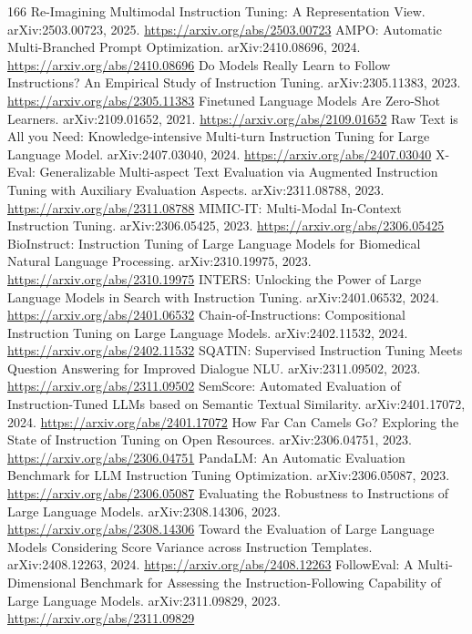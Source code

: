 \documentclass[11pt]{article}
\begin{document}
\begin{thebibliography}{166}
 Re-Imagining Multimodal Instruction Tuning: A Representation View. arXiv:2503.00723, 2025. \url{https://arxiv.org/abs/2503.00723}
 AMPO: Automatic Multi-Branched Prompt Optimization. arXiv:2410.08696, 2024. \url{https://arxiv.org/abs/2410.08696}
 Do Models Really Learn to Follow Instructions? An Empirical Study of Instruction Tuning. arXiv:2305.11383, 2023. \url{https://arxiv.org/abs/2305.11383}
 Finetuned Language Models Are Zero-Shot Learners. arXiv:2109.01652, 2021. \url{https://arxiv.org/abs/2109.01652}
 Raw Text is All you Need: Knowledge-intensive Multi-turn Instruction Tuning for Large Language Model. arXiv:2407.03040, 2024. \url{https://arxiv.org/abs/2407.03040}
 X-Eval: Generalizable Multi-aspect Text Evaluation via Augmented Instruction Tuning with Auxiliary Evaluation Aspects. arXiv:2311.08788, 2023. \url{https://arxiv.org/abs/2311.08788}
 MIMIC-IT: Multi-Modal In-Context Instruction Tuning. arXiv:2306.05425, 2023. \url{https://arxiv.org/abs/2306.05425}
 BioInstruct: Instruction Tuning of Large Language Models for Biomedical Natural Language Processing. arXiv:2310.19975, 2023. \url{https://arxiv.org/abs/2310.19975}
 INTERS: Unlocking the Power of Large Language Models in Search with Instruction Tuning. arXiv:2401.06532, 2024. \url{https://arxiv.org/abs/2401.06532}
 Chain-of-Instructions: Compositional Instruction Tuning on Large Language Models. arXiv:2402.11532, 2024. \url{https://arxiv.org/abs/2402.11532}
 SQATIN: Supervised Instruction Tuning Meets Question Answering for Improved Dialogue NLU. arXiv:2311.09502, 2023. \url{https://arxiv.org/abs/2311.09502}
 SemScore: Automated Evaluation of Instruction-Tuned LLMs based on Semantic Textual Similarity. arXiv:2401.17072, 2024. \url{https://arxiv.org/abs/2401.17072}
 How Far Can Camels Go? Exploring the State of Instruction Tuning on Open Resources. arXiv:2306.04751, 2023. \url{https://arxiv.org/abs/2306.04751}
 PandaLM: An Automatic Evaluation Benchmark for LLM Instruction Tuning Optimization. arXiv:2306.05087, 2023. \url{https://arxiv.org/abs/2306.05087}
 Evaluating the Robustness to Instructions of Large Language Models. arXiv:2308.14306, 2023. \url{https://arxiv.org/abs/2308.14306}
 Toward the Evaluation of Large Language Models Considering Score Variance across Instruction Templates. arXiv:2408.12263, 2024. \url{https://arxiv.org/abs/2408.12263}
 FollowEval: A Multi-Dimensional Benchmark for Assessing the Instruction-Following Capability of Large Language Models. arXiv:2311.09829, 2023. \url{https://arxiv.org/abs/2311.09829}

\end{thebibliography}
\end{document}
